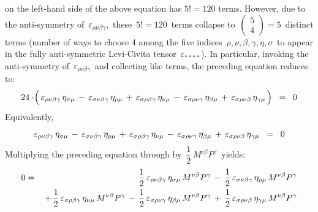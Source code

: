 \begin{enumerate}
    on the left-hand side of the above equation has $5! = 120$ terms.
    However, due to the anti-symmetry of \,$\varepsilon_{\rho\mu\beta\gamma}$,\,
    these \,$5! = 120$\, terms collapse to
    \,$\left(\begin{array}{c} 5 \\ 4 \end{array}\right) = 5$\,
    distinct terms (number of ways to choose 4 among the five indices
    \,$\rho,\nu,\beta,\gamma,\eta,\sigma$\, to appear in the fully anti-symmetric Levi-Civita tensor
    \,$\varepsilon_{****}$).
    In particular, invoking the anti-symmetry of
    \,$\varepsilon_{\rho\nu\beta\gamma}$\,
    and collecting like terms, the preceding equation reduces to:
    \begin{equation*}
    24\cdot\!\left(\,
	    \varepsilon_{\rho\nu\beta\gamma}\,\eta_{\sigma\mu}
	    \,\overset{{\color{white}.}}{-}\,
	    \varepsilon_{\sigma\nu\beta\gamma}\,\eta_{\rho\mu}
	    \,+\,
	    \varepsilon_{\sigma\rho\beta\gamma}\,\eta_{\nu\mu}
	    \,-\,
	    \varepsilon_{\sigma\rho\nu\gamma}\,\eta_{\beta\mu}
	    \,+\,
	    \varepsilon_{\sigma\rho\nu\beta}\,\eta_{\gamma\mu}
	    \,\right)
    \;\; = \;\;
    	0
    \end{equation*}
    Equivalently,
    \begin{equation*}
    \varepsilon_{\rho\nu\beta\gamma}\,\eta_{\sigma\mu}
    \,\overset{{\color{white}.}}{-}\,
    \varepsilon_{\sigma\nu\beta\gamma}\,\eta_{\rho\mu}
    \,+\,
    \varepsilon_{\sigma\rho\beta\gamma}\,\eta_{\nu\mu}
    \,-\,
    \varepsilon_{\sigma\rho\nu\gamma}\,\eta_{\beta\mu}
    \,+\,
    \varepsilon_{\sigma\rho\nu\beta}\,\eta_{\gamma\mu}
    \;\; = \;\;
    	0
    \end{equation*}
    Multiplying the preceding equation through by
    \,$\dfrac{1}{2}\,M^{\nu\beta}P^{\gamma}$\,
    yields:
    \begin{eqnarray*}
    0
    & = &
	    {\color{white}\,+\,}
    	\dfrac{1}{2}\,\varepsilon_{\rho\nu\beta\gamma}\,\eta_{\sigma\mu}\,M^{\nu\beta}P^{\gamma}
	    \,\overset{{\color{white}.}}{-}\,
	    \dfrac{1}{2}\,\varepsilon_{\sigma\nu\beta\gamma}\,\eta_{\rho\mu}\,M^{\nu\beta}P^{\gamma}
    \\
    &&
	    \,+\,
	    \dfrac{1}{2}\,\varepsilon_{\sigma\rho\beta\gamma}\,\eta_{\nu\mu}\,M^{\nu\beta}P^{\gamma}
	    \,-\,
	    \dfrac{1}{2}\,\varepsilon_{\sigma\rho\nu\gamma}\,\eta_{\beta\mu}\,M^{\nu\beta}P^{\gamma}
	    \,+\,
	    \dfrac{1}{2}\,\varepsilon_{\sigma\rho\nu\beta}\,\eta_{\gamma\mu}\,M^{\nu\beta}P^{\gamma}
	\\

\end{eqnarray*}
\end{enumerate}
